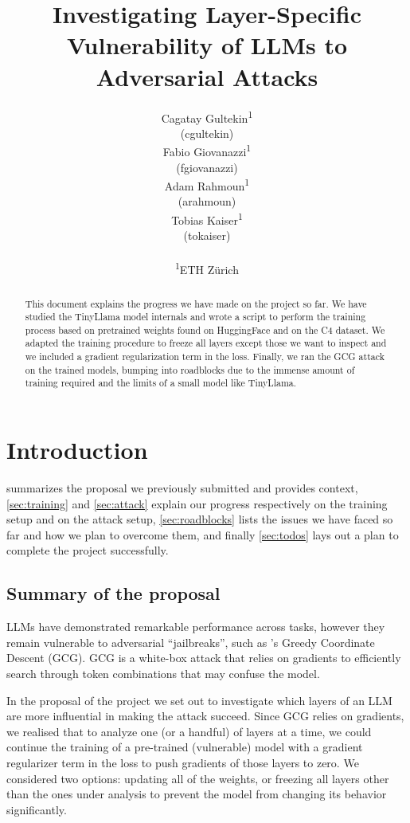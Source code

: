 \documentclass[11pt]{article}
\title{Investigating Layer-Specific Vulnerability of LLMs to
Adversarial Attacks\\\normalfont{\large{Mid-term progress report}}}
\author{Cagatay Gultekin\textsuperscript{1} \\
  (cgultekin) \\\And
  Fabio Giovanazzi\textsuperscript{1} \\
  (fgiovanazzi) \\\And
  Adam Rahmoun\textsuperscript{1} \\
  (arahmoun) \\\And
  Tobias Kaiser\textsuperscript{1} \\
  (tokaiser) \\\AND
\\
  \textsuperscript{1}ETH Zürich
}
\begin{document}
\maketitle
\begin{abstract}
This document explains the progress we have made on the project so far. We have studied the TinyLlama model internals and wrote a script to perform the training process based on pretrained weights found on HuggingFace and on the C4 dataset. We adapted the training procedure to freeze all layers except those we want to inspect and we included a gradient regularization term in the loss. Finally, we ran the GCG attack on the trained models, bumping into roadblocks due to the immense amount of training required and the limits of a small model like TinyLlama.
\end{abstract}

\section{Introduction}
\label{sec:intro}

 summarizes the proposal we previously submitted and provides context, \cref{sec:training} and \cref{sec:attack} explain our progress respectively on the training setup and on the attack setup, \cref{sec:roadblocks} lists the issues we have faced so far and how we plan to overcome them, and finally \cref{sec:todos} lays out a plan to complete the project successfully.

\subsection{Summary of the proposal}

LLMs have demonstrated remarkable performance across tasks, however they remain vulnerable to adversarial ``jailbreaks'', such as \cite{zou2023universal}'s Greedy Coordinate Descent (GCG). GCG is a white-box attack that relies on gradients to efficiently search through token combinations that may confuse the model.

In the proposal of the project we set out to investigate which layers of an LLM are more influential in making the attack succeed. Since GCG relies on gradients, we realised that to analyze one (or a handful) of layers at a time, we could continue the training of a pre-trained (vulnerable) model with a gradient regularizer term in the loss to push gradients of those layers to zero. We considered two options: updating all of the weights, or freezing all layers other than the ones under analysis to prevent the model from changing its behavior significantly.
\end{document}
